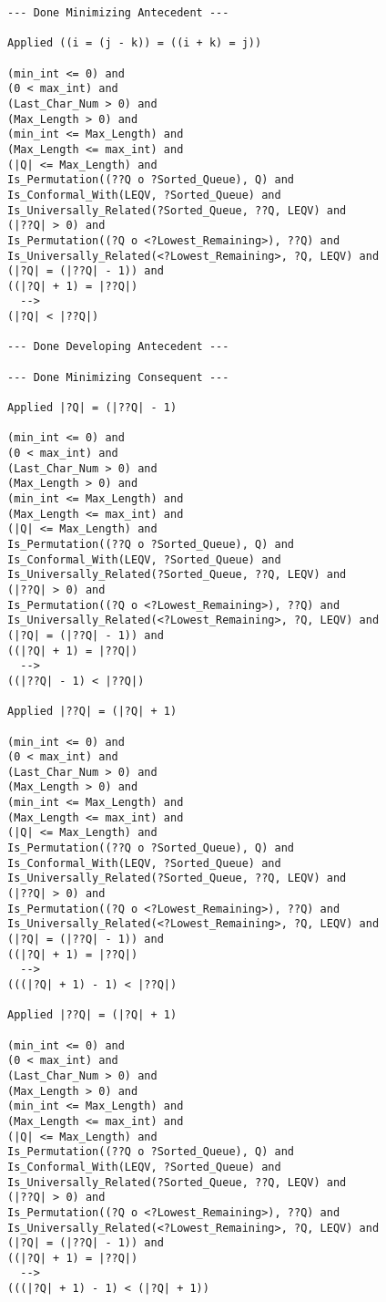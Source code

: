 \begin{lstlisting}[language=resolve]
--- Done Minimizing Antecedent ---

Applied ((i = (j - k)) = ((i + k) = j))

(min_int <= 0) and
(0 < max_int) and
(Last_Char_Num > 0) and
(Max_Length > 0) and
(min_int <= Max_Length) and
(Max_Length <= max_int) and
(|Q| <= Max_Length) and
Is_Permutation((??Q o ?Sorted_Queue), Q) and
Is_Conformal_With(LEQV, ?Sorted_Queue) and
Is_Universally_Related(?Sorted_Queue, ??Q, LEQV) and
(|??Q| > 0) and
Is_Permutation((?Q o <?Lowest_Remaining>), ??Q) and
Is_Universally_Related(<?Lowest_Remaining>, ?Q, LEQV) and
(|?Q| = (|??Q| - 1)) and
((|?Q| + 1) = |??Q|)
  -->
(|?Q| < |??Q|)

--- Done Developing Antecedent ---

--- Done Minimizing Consequent ---

Applied |?Q| = (|??Q| - 1)

(min_int <= 0) and
(0 < max_int) and
(Last_Char_Num > 0) and
(Max_Length > 0) and
(min_int <= Max_Length) and
(Max_Length <= max_int) and
(|Q| <= Max_Length) and
Is_Permutation((??Q o ?Sorted_Queue), Q) and
Is_Conformal_With(LEQV, ?Sorted_Queue) and
Is_Universally_Related(?Sorted_Queue, ??Q, LEQV) and
(|??Q| > 0) and
Is_Permutation((?Q o <?Lowest_Remaining>), ??Q) and
Is_Universally_Related(<?Lowest_Remaining>, ?Q, LEQV) and
(|?Q| = (|??Q| - 1)) and
((|?Q| + 1) = |??Q|)
  -->
((|??Q| - 1) < |??Q|)

Applied |??Q| = (|?Q| + 1)

(min_int <= 0) and
(0 < max_int) and
(Last_Char_Num > 0) and
(Max_Length > 0) and
(min_int <= Max_Length) and
(Max_Length <= max_int) and
(|Q| <= Max_Length) and
Is_Permutation((??Q o ?Sorted_Queue), Q) and
Is_Conformal_With(LEQV, ?Sorted_Queue) and
Is_Universally_Related(?Sorted_Queue, ??Q, LEQV) and
(|??Q| > 0) and
Is_Permutation((?Q o <?Lowest_Remaining>), ??Q) and
Is_Universally_Related(<?Lowest_Remaining>, ?Q, LEQV) and
(|?Q| = (|??Q| - 1)) and
((|?Q| + 1) = |??Q|)
  -->
(((|?Q| + 1) - 1) < |??Q|)

Applied |??Q| = (|?Q| + 1)

(min_int <= 0) and
(0 < max_int) and
(Last_Char_Num > 0) and
(Max_Length > 0) and
(min_int <= Max_Length) and
(Max_Length <= max_int) and
(|Q| <= Max_Length) and
Is_Permutation((??Q o ?Sorted_Queue), Q) and
Is_Conformal_With(LEQV, ?Sorted_Queue) and
Is_Universally_Related(?Sorted_Queue, ??Q, LEQV) and
(|??Q| > 0) and
Is_Permutation((?Q o <?Lowest_Remaining>), ??Q) and
Is_Universally_Related(<?Lowest_Remaining>, ?Q, LEQV) and
(|?Q| = (|??Q| - 1)) and
((|?Q| + 1) = |??Q|)
  -->
(((|?Q| + 1) - 1) < (|?Q| + 1))


\end{lstlisting}
